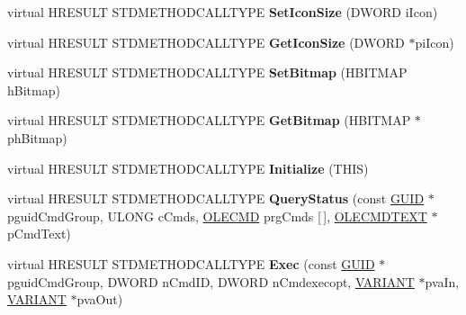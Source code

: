 \begin{DoxyCompactItemize}
\item 
\mbox{\label{class_c_menu_desk_bar_ae045ca07614d6cfbe5c51271748690b3}} 
virtual H\+R\+E\+S\+U\+LT S\+T\+D\+M\+E\+T\+H\+O\+D\+C\+A\+L\+L\+T\+Y\+PE {\bfseries Set\+Icon\+Size} (D\+W\+O\+RD i\+Icon)
\item 
\mbox{\label{class_c_menu_desk_bar_a34d4a05f04973b083a46aade9e261b9b}} 
virtual H\+R\+E\+S\+U\+LT S\+T\+D\+M\+E\+T\+H\+O\+D\+C\+A\+L\+L\+T\+Y\+PE {\bfseries Get\+Icon\+Size} (D\+W\+O\+RD $\ast$pi\+Icon)
\item 
\mbox{\label{class_c_menu_desk_bar_a7abdb080cbaf628ca01eff940b247491}} 
virtual H\+R\+E\+S\+U\+LT S\+T\+D\+M\+E\+T\+H\+O\+D\+C\+A\+L\+L\+T\+Y\+PE {\bfseries Set\+Bitmap} (H\+B\+I\+T\+M\+AP h\+Bitmap)
\item 
\mbox{\label{class_c_menu_desk_bar_abfc3e2f3c579836b8d66566339fe47ce}} 
virtual H\+R\+E\+S\+U\+LT S\+T\+D\+M\+E\+T\+H\+O\+D\+C\+A\+L\+L\+T\+Y\+PE {\bfseries Get\+Bitmap} (H\+B\+I\+T\+M\+AP $\ast$ph\+Bitmap)
\item 
\mbox{\label{class_c_menu_desk_bar_a19177cd68b96cfab701305d5a38452c8}} 
virtual H\+R\+E\+S\+U\+LT S\+T\+D\+M\+E\+T\+H\+O\+D\+C\+A\+L\+L\+T\+Y\+PE {\bfseries Initialize} (T\+H\+IS)
\item 
\mbox{\label{class_c_menu_desk_bar_a22542564c2c15c242fdf95e87894c9be}} 
virtual H\+R\+E\+S\+U\+LT S\+T\+D\+M\+E\+T\+H\+O\+D\+C\+A\+L\+L\+T\+Y\+PE {\bfseries Query\+Status} (const \hyperlink{interface_g_u_i_d}{G\+U\+ID} $\ast$pguid\+Cmd\+Group, U\+L\+O\+NG c\+Cmds, \hyperlink{struct_i_ole_command_target_1_1__tag_o_l_e_c_m_d}{O\+L\+E\+C\+MD} prg\+Cmds \mbox{[}$\,$\mbox{]}, \hyperlink{struct_i_ole_command_target_1_1__tag_o_l_e_c_m_d_t_e_x_t}{O\+L\+E\+C\+M\+D\+T\+E\+XT} $\ast$p\+Cmd\+Text)
\item 
\mbox{\label{class_c_menu_desk_bar_af81f0d7ee7709a35c6683d3fe7ece38d}} 
virtual H\+R\+E\+S\+U\+LT S\+T\+D\+M\+E\+T\+H\+O\+D\+C\+A\+L\+L\+T\+Y\+PE {\bfseries Exec} (const \hyperlink{interface_g_u_i_d}{G\+U\+ID} $\ast$pguid\+Cmd\+Group, D\+W\+O\+RD n\+Cmd\+ID, D\+W\+O\+RD n\+Cmdexecopt, \hyperlink{structtag_v_a_r_i_a_n_t}{V\+A\+R\+I\+A\+NT} $\ast$pva\+In, \hyperlink{structtag_v_a_r_i_a_n_t}{V\+A\+R\+I\+A\+NT} $\ast$pva\+Out)

\end{DoxyCompactItemize}
